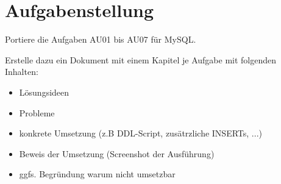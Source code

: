 
\section{Aufgabenstellung}
Portiere die Aufgaben AU01 bis AU07 für MySQL.

Erstelle dazu ein Dokument mit einem Kapitel je Aufgabe mit folgenden Inhalten:

\begin{itemize}
	\item Lösungsideen
	\item Probleme
	\item konkrete Umsetzung (z.B DDL-Script, zusätrzliche INSERTs, ...)
	\item Beweis der Umsetzung (Screenshot der Ausführung)
	\item ggfs. Begründung warum nicht umsetzbar
\end{itemize}

\clearpage